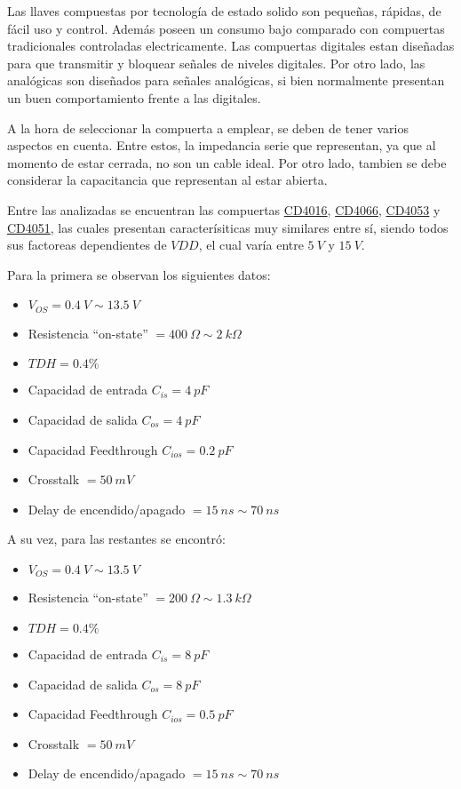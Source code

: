 Las llaves compuestas por tecnología de estado solido son pequeñas, rápidas, de fácil uso y control. Además poseen un consumo bajo comparado con compuertas tradicionales controladas electricamente. Las compuertas digitales estan diseñadas para que transmitir y bloquear señales de niveles digitales. Por otro lado, las analógicas son diseñados para señales analógicas, si bien normalmente presentan un buen comportamiento frente a las digitales.

A la hora de seleccionar la compuerta a emplear, se deben de tener varios aspectos en cuenta. Entre estos, la impedancia serie que representan, ya que al momento de estar cerrada, no son un cable ideal. Por otro lado, tambien se debe considerar la capacitancia que representan al estar abierta.

Entre las analizadas se encuentran las compuertas \href{http://www.ti.com/lit/ds/symlink/cd4016b.pdf}{CD4016}, \href{http://www.ti.com/lit/ds/symlink/cd4066b.pdf}{CD4066}, \href{http://www.ti.com/lit/ds/symlink/cd4051b.pdf}{CD4053} y \href{http://www.ti.com/lit/ds/symlink/cd4051b.pdf}{CD4051}, las cuales presentan caracterísiticas muy similares entre sí, siendo todos sus factoreas dependientes de $VDD$, el cual varía entre $5 \ V$ y $15 \ V$.

Para la primera se observan los siguientes datos:
\begin{multicols}{2}
\begin{itemize}
	\item $V_{OS} = 0.4 \ V \sim 13.5 \ V$
	\item Resistencia ``on-state'' $= 400 \ \Omega \sim 2 \ k\Omega$
	\item $TDH = 0.4\%$
	\item Capacidad de entrada $C_{is} = 4 \ pF$
	\item Capacidad de salida $C_{os} = 4 \ pF$
	\item Capacidad Feedthrough $C_{ios} = 0.2 \ pF$
	\item Crosstalk $= 50 \ mV$
	\item Delay de encendido/apagado $= 15 \ ns \sim 70 \ ns$
\end{itemize}
\end{multicols}

A su vez, para las restantes se encontró:
\begin{multicols}{2}
\begin{itemize}
	\item $V_{OS} = 0.4 \ V \sim 13.5 \ V$
	\item Resistencia ``on-state'' $= 200 \ \Omega \sim 1.3 \ k\Omega$
	\item $TDH = 0.4\%$
	\item Capacidad de entrada $C_{is} = 8 \ pF$
	\item Capacidad de salida $C_{os} = 8 \ pF$
	\item Capacidad Feedthrough $C_{ios} = 0.5 \ pF$
	\item Crosstalk $= 50 \ mV$
	\item Delay de encendido/apagado $= 15 \ ns \sim 70 \ ns$
\end{itemize}
\end{multicols}

